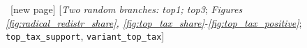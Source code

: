 \begin{enumerate}[resume]
  ~[new page] [\textit{Two random branches: top1; top3}; \textit{Figures \ref{fig:radical_redistr_share}, \ref{fig:top_tax_share}-\ref{fig:top_tax_positive}}; 
\verb|top_tax_support|, \verb|variant_top_tax|]

\end{enumerate}
